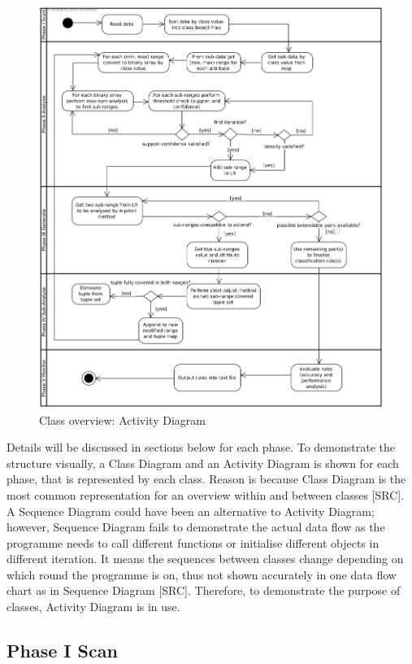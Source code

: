 \begin{figure}[!htbp]
    \centering
    \includegraphics[width=6.5in]{figures/activity_overview}
    \caption[Class overview: Activity Diagram]{Class overview: Activity Diagram}
    \label{fig:figure4_1}
\end{figure}


Details will be discussed in sections below for each phase. To demonstrate the structure visually, a Class Diagram and an Activity Diagram is shown for each phase, that is represented by each class. Reason is because Class Diagram is the most common representation for an overview within and between classes [SRC]. A Sequence Diagram could have been an alternative to Activity Diagram; however, Sequence Diagram fails to demonstrate the actual data flow as the programme needs to call different functions or initialise different objects in different iteration. It means the sequences between classes change depending on which round the programme is on, thus not shown accurately in one data flow chart as in Sequence Diagram [SRC]. Therefore, to demonstrate the purpose of classes, Activity Diagram is in use.

\subsection{Phase I Scan}

